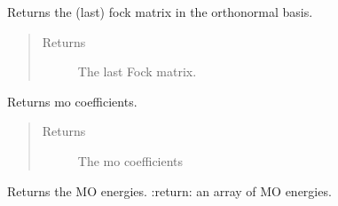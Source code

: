 \documentclass[letterpaper,10pt,english]{sphinxmanual}
\begin{document}
\begin{fulllineitems}
\begin{fulllineitems}
\end{fulllineitems}


\begin{fulllineitems}
\label{\detokenize{RHF:hf.HartreeFock.RHF.MF.get_fock_orth}}
Returns the (last) fock matrix in the orthonormal basis.
\begin{quote}\begin{description}
\item[{Returns}] \leavevmode
The last Fock matrix.

\end{description}\end{quote}

\end{fulllineitems}


\begin{fulllineitems}
\label{\detokenize{RHF:hf.HartreeFock.RHF.MF.get_mo_coeff}}
Returns mo coefficients.
\begin{quote}\begin{description}
\item[{Returns}] \leavevmode
The mo coefficients

\end{description}\end{quote}

\end{fulllineitems}


\begin{fulllineitems}
\label{\detokenize{RHF:hf.HartreeFock.RHF.MF.get_mo_energy}}
Returns the MO energies.
:return: an array of MO energies.

\end{fulllineitems}



\end{fulllineitems}
\end{document}
